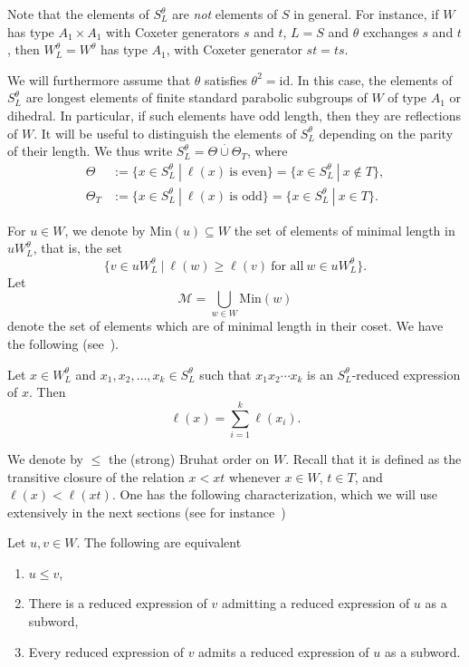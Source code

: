 Note that the elements of $S_L^\theta$ are \textit{not} elements of $S$ in general. For instance, if $W$ has type $A_1 \times A_1$ with Coxeter generators $s$ and $t$, $L=S$ and $\theta$ exchanges $s$ and $t$, then $W_L^\theta=W^\theta$ has type $A_1$, with Coxeter generator $st=ts$. 

We will furthermore assume that $\theta$ satisfies $\theta^2=\mathrm{id}$. In this case, the elements of $S_L^\theta$ are longest elements of finite standard parabolic subgroups of $W$ of type $A_1$ or dihedral. In particular, if such elements have odd length, then they are reflections of $W$. It will be useful to distinguish the elements of $S_L^\theta$ depending on the parity of their length. We thus write $S_L^\theta=\Theta\overset{\cdot}{\cup} \Theta_T$, where \begin{align*}\Theta&:=\{ x\in S_L^\theta~|~\ell(x)~\text{is even}\}=\{ x\in S_L^\theta~|~x\notin T\},\\
\Theta_T&:=\{ x\in S_L^\theta~|~\ell(x)~\text{is odd}\}=\{ x\in S_L^\theta~|~x\in T\}.\end{align*}

For $u\in W$, we denote by $\mathrm{Min}(u)\subseteq W$ the set of elements of minimal length in $u W_L^\theta$, that is, the set $$\{ v\in u W_L^\theta~|~\ell(w)\geq \ell(v)~\text{for all}~w\in u W_L^\theta\}.$$
Let $$\mathcal{M}=\bigcup_{w\in W} \mathrm{Min}(w)$$ denote the set of elements which are of minimal length in their coset. We have the following (see~\cite[Proposition 3.5]{muhlh}).
\begin{prop}\label{prop_muhlh}
Let $x\in W_L^\theta$ and $x_1, x_2, \dots, x_k\in S_L^\theta$ such that $x_1 x_2 \cdots x_k$ is an $S_L^\theta$-reduced expression of $x$. Then $$\ell(x)=\sum_{i=1}^k \ell(x_i).$$
\end{prop}


We denote by $\leq$ the (strong) Bruhat order on $W$. Recall that it is defined as the transitive closure of the relation $x < xt$ whenever $x\in W$, $t\in T$, and $\ell(x)<\ell(xt)$. One has the following characterization, which we will use extensively in the next sections (see for instance~\cite[Corollary 2.2.3]{BB})

\begin{prop}
Let $u,v\in W$. The following are equivalent
\begin{enumerate}
	\item $u \leq v$, 
	\item There is a reduced expression of $v$ admitting a reduced expression of $u$ as a subword, 
	\item Every reduced expression of $v$ admits a reduced expression of $u$ as a subword. 
\end{enumerate}
\end{prop}

